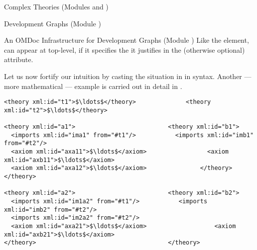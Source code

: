 \begin{tchapter}[id=complex-theories,short=Complex Theories]{Complex Theories (Modules
    {} and {})}
\begin{tsection}[id=development-graphs,short=Development Graphs]{Development Graphs
    (Module {})}
\begin{tsubsection}[id=dg-omdoc,short=OMDoc Development Graphs]{An OMDoc Infrastructure
    for Development Graphs (Module {})}
Like the {} element, {} can appear at top-level,
if it specifies the {} it justifies in the (otherwise optional)
{} attribute.

Let us now fortify our intuition by casting the situation in {}
in {\omdoc} syntax. Another --- more mathematical --- example is carried out in detail in
{}.

\begin{lstlisting}[label=lst:thi,mathescape,
                   index={theory,imports,axiom},
                   caption={The {\omdoc} representation of the theories
                   in {\myfigref{thi-proof}}.}]
<theory xml:id="t1">$\ldots$</theory>              <theory xml:id="t2">$\ldots$</theory> 

<theory xml:id="a1">                          <theory xml:id="b1">
  <imports xml:id="ima1" from="#t1"/>           <imports xml:id="imb1" from="#t2"/>
  <axiom xml:id="axa11">$\ldots$</axiom>                 <axiom xml:id="axb11">$\ldots$</axiom>
  <axiom xml:id="axa12">$\ldots$</axiom>               </theory>
</theory>

<theory xml:id="a2">                          <theory xml:id="b2">
  <imports xml:id="im1a2" from="#t1"/>           <imports xml:id="imb2" from="#t2"/>
  <imports xml:id="im2a2" from="#t2"/> 
  <axiom xml:id="axa21">$\ldots$</axiom>                   <axiom xml:id="axb21">$\ldots$</axiom>
</theory>                                     </theory>


\end{lstlisting}
\end{tsubsection}
\end{tsection}
\end{tchapter}
